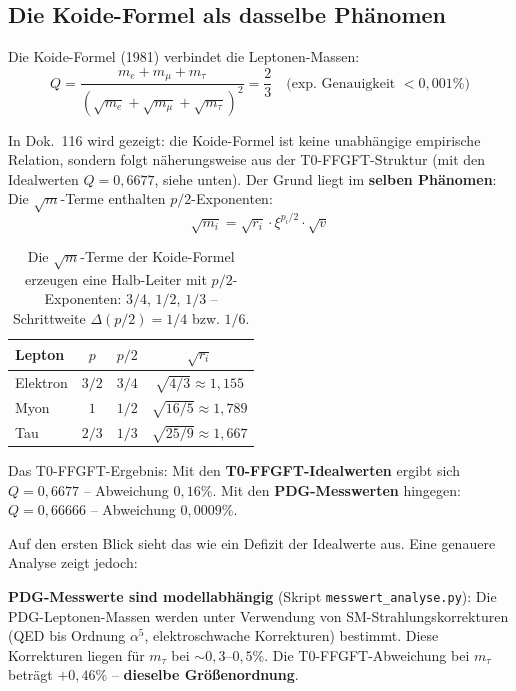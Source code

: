 \subsection{Die Koide-Formel als dasselbe Phänomen}

Die Koide-Formel (1981) verbindet die Leptonen-Massen:
\begin{equation}
    Q = \frac{m_e + m_\mu + m_\tau}
    {(\sqrt{m_e} + \sqrt{m_\mu} + \sqrt{m_\tau})^2} = \frac{2}{3}
    \quad \text{(exp. Genauigkeit $< 0{,}001\%$)}
\end{equation}

In Dok.~116 wird gezeigt: die Koide-Formel ist keine unabhängige
empirische Relation, sondern folgt näherungsweise aus der T0-FFGFT-Struktur
(mit den Idealwerten $Q = 0{,}6677$, siehe unten).
Der Grund liegt im \textbf{selben Phänomen}: Die $\sqrt{m}$-Terme
enthalten $p/2$-Exponenten:
\begin{equation}
    \sqrt{m_i} = \sqrt{r_i} \cdot \xi^{p_i/2} \cdot \sqrt{v}
\end{equation}

\begin{table}[htbp]
\centering\small
\begin{tabular}{lccc}
\toprule
\textbf{Lepton} & $p$ & $p/2$ & $\sqrt{r_i}$ \\
\midrule
Elektron & $3/2$ & $3/4$ & $\sqrt{4/3} \approx 1{,}155$ \\
Myon     & $1$   & $1/2$ & $\sqrt{16/5} \approx 1{,}789$ \\
Tau      & $2/3$ & $1/3$ & $\sqrt{25/9} \approx 1{,}667$ \\
\bottomrule
\end{tabular}
\caption{Die $\sqrt{m}$-Terme der Koide-Formel erzeugen eine
Halb-Leiter mit $p/2$-Exponenten: $3/4$, $1/2$, $1/3$ --
Schrittweite $\Delta(p/2) = 1/4$ bzw. $1/6$.}
\label{tab:koide_p}
\end{table}

Das T0-FFGFT-Ergebnis: Mit den \textbf{T0-FFGFT-Idealwerten} ergibt sich $Q = 0{,}6677$ -- Abweichung $0{,}16\%$. Mit den \textbf{PDG-Messwerten} hingegen: $Q = 0{,}66666$ -- Abweichung $0{,}0009\%$.

Auf den ersten Blick sieht das wie ein Defizit der Idealwerte aus.
Eine genauere Analyse zeigt jedoch:

\textbf{PDG-Messwerte sind modellabhängig} (Skript \texttt{messwert\_analyse.py}):
Die PDG-Leptonen-Massen werden unter Verwendung von SM-Strahlungs\-korrekturen
(QED bis Ordnung $\alpha^5$, elektroschwache Korrekturen) bestimmt.
Diese Korrekturen liegen für $m_\tau$ bei $\sim 0{,}3$--$0{,}5\%$.
Die T0-FFGFT-Abweichung bei $m_\tau$ beträgt $+0{,}46\%$ --
\textbf{dieselbe Größenordnung}.

